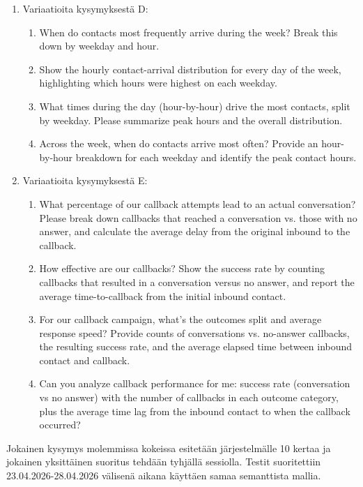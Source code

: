 \begin{enumerate}[label=\Alph*.]
  \item Variaatioita kysymyksestä D:
    \begin{enumerate}[label=\arabic*.]
      \item When do contacts most frequently arrive during the week? Break this down by weekday and hour.
      \item Show the hourly contact-arrival distribution for every day of the week, highlighting which hours were highest on each weekday.
      \item What times during the day (hour-by-hour) drive the most contacts, split by weekday. Please summarize peak hours and the overall distribution.
      \item Across the week, when do contacts arrive most often? Provide an hour-by-hour breakdown for each weekday and identify the peak contact hours.
    \end{enumerate}
  \item Variaatioita kysymyksestä E:
    \begin{enumerate}[label=\arabic*.]
      \item What percentage of our callback attempts lead to an actual conversation? Please break down callbacks that reached a conversation vs. those with no answer, and calculate the average delay from the original inbound to the callback.
      \item How effective are our callbacks? Show the success rate by counting callbacks that resulted in a conversation versus no answer, and report the average time-to-callback from the initial inbound contact.
      \item For our callback campaign, what's the outcomes split and average response speed? Provide counts of conversations vs. no-answer callbacks, the resulting success rate, and the average elapsed time between inbound contact and callback.
      \item Can you analyze callback performance for me: success rate (conversation vs no answer) with the number of callbacks in each outcome category, plus the average time lag from the inbound contact to when the callback occurred?
    \end{enumerate}
\end{enumerate}

Jokainen kysymys molemmissa kokeissa esitetään järjestelmälle 10 kertaa ja jokainen yksittäinen suoritus tehdään tyhjällä sessiolla. Testit suoritettiin 23.04.2026-28.04.2026 välisenä aikana käyttäen samaa semanttista mallia.

